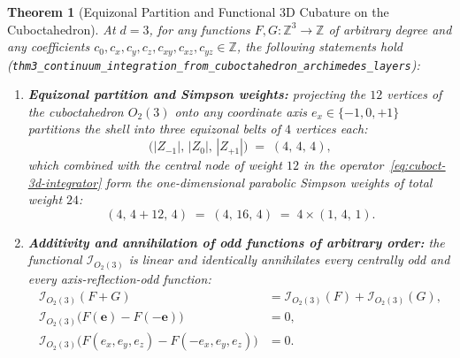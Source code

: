 \documentclass[11pt,a4paper]{article}
\theoremstyle{plain}
\newtheorem{theorem}{Theorem}[section]
\theoremstyle{definition}
\begin{document}
\begin{theorem}[Equizonal Partition and Functional 3D Cubature on the Cuboctahedron]
\label{thm:main-3}
At $d = 3$, for any functions $F, G\colon \mathbb{Z}^3 \to \mathbb{Z}$ of arbitrary degree and any coefficients $c_0, c_x, c_y, c_z, c_{xy}, c_{xz}, c_{yz} \in \mathbb{Z}$, the following statements hold (\texttt{thm3\_continuum\_integration\_from\_cuboctahedron\_archimedes\_layers}):
\begin{enumerate}[label=\textbf{(\roman*)},leftmargin=*]
\item \textbf{Equizonal partition and Simpson weights:}
  projecting the $12$ vertices of the cuboctahedron $O_2(3)$ onto any coordinate axis $e_x \in \{-1, 0, +1\}$ partitions the shell into three equizonal belts of $4$ vertices each:
  \begin{equation}
    \label{eq:equizonal-444}
    \bigl(|Z_{-1}|,\, |Z_0|,\, |Z_{+1}|\bigr) \;=\; (4,\, 4,\, 4),
  \end{equation}
  which combined with the central node of weight $12$ in the operator~\eqref{eq:cuboct-3d-integrator} form the one-dimensional parabolic Simpson weights of total weight $24$:
  \begin{equation}
    \label{eq:simpson-weights-4-16-4}
    (4,\, 4 + 12,\, 4) \;=\; (4,\, 16,\, 4) \;=\; 4\times(1,\, 4,\, 1).
  \end{equation}

\item \textbf{Additivity and annihilation of odd functions of arbitrary order:}
  the functional $\mathcal{I}_{O_2(3)}$ is linear and identically annihilates every centrally odd and every axis-reflection-odd function:
  \begin{align}
    \mathcal{I}_{O_2(3)}(F + G) &= \mathcal{I}_{O_2(3)}(F) + \mathcal{I}_{O_2(3)}(G), \label{eq:functional-additivity} \\
    \mathcal{I}_{O_2(3)}\bigl(F(\mathbf{e}) - F(-\mathbf{e})\bigr) &= 0, \label{eq:functional-central-odd} \\
    \mathcal{I}_{O_2(3)}\bigl(F(e_x, e_y, e_z) - F(-e_x, e_y, e_z)\bigr) &= 0. \label{eq:functional-axis-odd}
  \end{align}


\end{enumerate}
\end{theorem}
\end{document}

